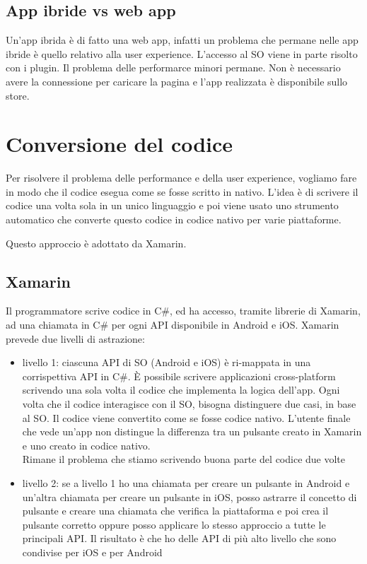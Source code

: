 \subsection{App ibride vs web app}
Un'app ibrida è di fatto una web app, infatti un problema che permane nelle app ibride è quello relativo alla user experience. 
L'accesso al SO viene in parte risolto con i plugin. 
Il problema delle performarce minori permane. 
Non è necessario avere la connessione per caricare la pagina e l'app realizzata è disponibile sullo store. 

\section{Conversione del codice}
Per risolvere il problema delle performance e della user experience, vogliamo fare in modo che il codice esegua come se fosse scritto in nativo. 
L'idea è di scrivere il codice una volta sola in un unico linguaggio e poi viene usato uno strumento automatico che converte questo codice in codice nativo per varie piattaforme.

Questo approccio è adottato da Xamarin.

\subsection{Xamarin}
Il programmatore scrive codice in C\#, ed ha accesso, tramite librerie di Xamarin, ad una chiamata in C\# per ogni API disponibile in Android e iOS. 
Xamarin prevede due livelli di astrazione:
\begin{itemize}
    \item livello 1: ciascuna API di SO (Android e iOS) è ri-mappata in una corrispettiva API in C\#.
    È possibile scrivere applicazioni cross-platform scrivendo una sola volta il codice che implementa la logica dell'app.
    Ogni volta che il codice interagisce con il SO, bisogna distinguere due casi, in base al SO.
    Il codice viene convertito come se fosse codice nativo. L'utente finale che vede un'app non distingue la differenza tra un pulsante creato in Xamarin e uno creato in codice nativo. 
    \\ Rimane il problema che stiamo scrivendo buona parte del codice due volte
    \item livello 2: se a livello 1 ho una chiamata per creare un pulsante in Android e un’altra chiamata per creare un pulsante in iOS, posso astrarre il concetto di pulsante e creare una chiamata che verifica la piattaforma e poi crea il pulsante corretto oppure posso applicare lo stesso approccio a tutte le principali API. Il risultato è che ho delle API di più alto livello che sono condivise per iOS e per Android
\end{itemize}


